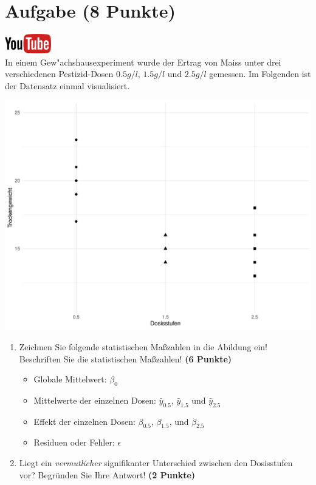 \documentclass[a4paper, 9pt]{scrartcl}\usepackage[]{graphicx}\usepackage[]{xcolor}
\makeatletter
\def\maxwidth{ %
  \ifdim\Gin@nat@width>\linewidth
    \linewidth
  \else
    \Gin@nat@width
  \fi
}
\newenvironment{knitrout}{}{} %
\makeatother
\begin{document}
\section{Aufgabe \hfill (8 Punkte)}

\hfill\href{https://youtu.be/Q7xtQJoOmQI}{\includegraphics[width =
  2cm]{img/youtube}}\\[1Ex]



In einem Gew{"a}chshausexperiment wurde der Ertrag von Maiss unter drei verschiedenen
Pestizid-Dosen $0.5 g/l$, $1.5 g/l$ und $2.5 g/l$ gemessen. Im Folgenden ist der
Datensatz einmal visualisiert.

\begin{knitrout}
\color{fgcolor}

{\centering \includegraphics[width=\maxwidth]{img/anova-01-a-1} 

}


\end{knitrout}

\begin{enumerate}
\item Zeichnen Sie folgende statistischen Ma{\ss}zahlen in die Abildung ein!
  Beschriften Sie die statistischen Ma{\ss}zahlen! \textbf{(6 Punkte)}
  \begin{itemize}
  \item Globale Mittelwert: $\beta_0$
  \item Mittelwerte der einzelnen Dosen: $\bar{y}_{0.5}$, $\bar{y}_{1.5}$ und $\bar{y}_{2.5}$
  \item Effekt der einzelnen Dosen: $\beta_{0.5}$, $\beta_{1.5}$,
    und $\beta_{2.5}$
  \item Residuen oder Fehler: $\epsilon$
  \end{itemize}
\item Liegt ein \textit{vermutlicher} signifikanter Unterschied zwischen
  den Dosisstufen vor? Begr{\"u}nden Sie Ihre Antwort! \textbf{(2 Punkte)}
\end{enumerate}
 
\end{document}
